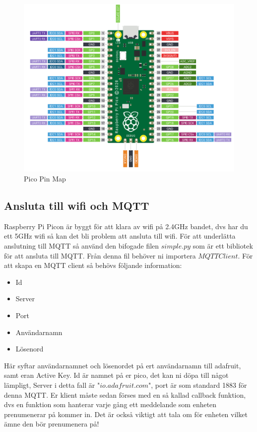 \documentclass{article}
\begin{document}
\begin{figure}[H]
    \centering
    \includegraphics[width = \textwidth]{bilder/picopinout.png}
    \caption{Pico Pin Map}
    \label{fig:pico}
\end{figure}

\subsection{Ansluta till wifi och MQTT}
Raspberry Pi Picon är byggt för att klara av wifi på 2.4GHz bandet, dvs har du ett 5GHz wifi så kan det bli problem att ansluta till wifi. För att underlätta anslutning till MQTT så använd den bifogade filen $simple.py$ som är ett bibliotek för att ansluta till MQTT. Från denna fil behöver ni importera $MQTTClient$.
För att skapa en MQTT client så behövs följande information:
\begin{itemize}
    \item Id
    \item Server
    \item Port
    \item Användarnamn
    \item Lösenord
\end{itemize}

Här syftar användarnamnet och lösenordet på ert användarnamn till adafruit, samt eran Active Key. Id är namnet på er pico, det kan ni döpa till något lämpligt, Server i detta fall är "$io.adafruit.com$", port är som standard 1883 för denna MQTT.
Er klient måste sedan förses med en så kallad callback funktion, dvs en funktion som hanterar varje gång ett meddelande som enheten prenumenerar på kommer in. Det är också viktigt att tala om för enheten vilket ämne den bör prenumenera på!
\end{document}

